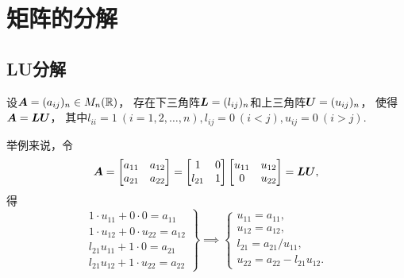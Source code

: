 \section{矩阵的分解}
\subsection{LU分解}
\begingroup
\def\L{\vb{L}}%
\def\U{\vb{U}}%
\begin{theorem}
设\(\boldsymbol{A} = (a_{ij})_n \in M_n(\mathbb{R})\)，
存在下三角阵\(\L = (l_{ij})_n\)和上三角阵\(\U = (u_{ij})_n\)，
使得\(\A = \L \U\)，
其中\(l_{ii} = 1\ (i=1,2,\dotsc,n),
l_{ij} = 0\ (i<j),
u_{ij} = 0\ (i>j)\).
\end{theorem}

举例来说，令\[
	\A = \begin{bmatrix}
		a_{11} & a_{12} \\
		a_{21} & a_{22}
	\end{bmatrix}
	= \begin{bmatrix}
		1 & 0 \\
		l_{21} & 1
	\end{bmatrix}
	\begin{bmatrix}
		u_{11} & u_{12} \\
		0 & u_{22}
	\end{bmatrix}
	= \L \U,
\]
得\[
	\left.\begin{array}{r}
		1 \cdot u_{11} + 0 \cdot 0 = a_{11} \\
		1 \cdot u_{12} + 0 \cdot u_{22} = a_{12} \\
		l_{21} u_{11} + 1 \cdot 0 = a_{21} \\
		l_{21} u_{12} + 1 \cdot u_{22} = a_{22}
	\end{array}\right\}
	\implies
	\left\{\begin{array}{l}
		u_{11} = a_{11}, \\
		u_{12} = a_{12}, \\
		l_{21} = a_{21} / u_{11}, \\
		u_{22} = a_{22} - l_{21} u_{12}.
	\end{array}\right.
\]

